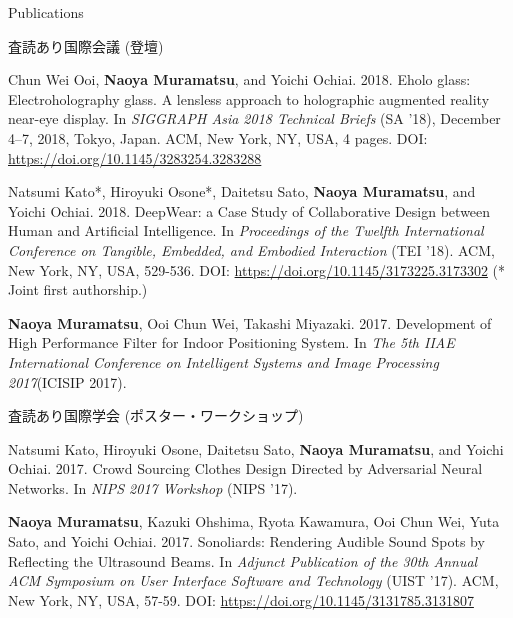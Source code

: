 \documentclass{resume} %
\begin{document}
\begin{rSection}{Publications} \itemsep 4pt



    \begin{rSubsection}{査読あり国際会議 (登壇)}{}{}{}{}
        \item Chun Wei Ooi, \textbf{Naoya Muramatsu}, and Yoichi Ochiai. 2018. Eholo glass: Electroholography glass. A lensless approach to holographic augmented reality near-eye display. In \textit{SIGGRAPH Asia 2018 Technical Briefs} (SA ’18), December 4–7, 2018, Tokyo, Japan. ACM, New York, NY, USA, 4 pages. DOI: \url{https://doi.org/10.1145/3283254.3283288}

        \item Natsumi Kato*, Hiroyuki Osone*, Daitetsu Sato, \textbf{Naoya Muramatsu}, and Yoichi Ochiai. 2018. DeepWear: a Case Study of Collaborative Design between Human and Artificial Intelligence. In \textit{Proceedings of the Twelfth International Conference on Tangible, Embedded, and Embodied Interaction} (TEI ’18). ACM, New York, NY, USA, 529-536. DOI: \url{https://doi.org/10.1145/3173225.3173302} (* Joint first authorship.)

        \item \textbf{Naoya Muramatsu}, Ooi Chun Wei, Takashi Miyazaki. 2017. Development of High Performance Filter for Indoor Positioning System. In \textit{The 5th IIAE International Conference on Intelligent Systems and Image Processing 2017}(ICISIP 2017).
    \end{rSubsection}

    \begin{rSubsection}{査読あり国際学会 (ポスター・ワークショップ)}{}{}{}{}
        \item Natsumi Kato, Hiroyuki Osone, Daitetsu Sato, \textbf{Naoya Muramatsu}, and Yoichi Ochiai. 2017. Crowd Sourcing Clothes Design Directed by Adversarial Neural Networks. In \textit{NIPS 2017 Workshop} (NIPS ’17).

        \item \textbf{Naoya Muramatsu}, Kazuki Ohshima, Ryota Kawamura, Ooi Chun Wei, Yuta Sato, and Yoichi Ochiai. 2017. Sonoliards: Rendering Audible Sound Spots by Reflecting the Ultrasound Beams. In \textit{Adjunct Publication of the 30th Annual ACM Symposium on User Interface Software and Technology} (UIST ’17). ACM, New York, NY, USA, 57-59. DOI: \url{https://doi.org/10.1145/3131785.3131807}


\end{rSubsection}
\end{rSection}
\end{document}
